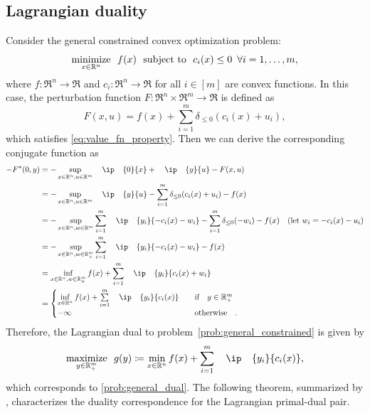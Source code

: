 \subsection{Lagrangian duality}
Consider the general constrained convex optimization problem:
\begin{equation} \label{prob:general_constrained} 
    \displaystyle\mathop{\hbox{\rm minimize}}_{x \in \mathbb{R}^n}\enspace f(x) \enspace\mathop{\hbox{\rm subject to}}\enspace c_i(x) \leq 0 \enspace \forall i = 1, \dots, m,
\end{equation}
where $f:\Re^n\to\Re$ and $c_i:\Re^n\to\Re$ for all $i\in[m]$ are convex functions. In this case, the perturbation function $F: \Re^n \times \Re^m \to \Re$ is defined as 
\begin{equation}
    F(x, u) = f(x) + \sum_{i = 1}^m \delta_{\leq 0}(c_i(x) + u_i),
\end{equation}
which satisfies \eqref{eq:value_fn_property}. Then we can derive the corresponding conjugate function as 
\begin{align*}
    -F^*(0, y) 
    &= -\sup_{x\in\Re^n, u\in\Re^m} \ip{0}{x} + \ip{y}{u} - F(x,u)
    \\&= -\sup_{x\in\Re^n, u\in\Re^m} \ip{y}{u} - \sum_{i = 1}^m \delta_{\leq 0}(c_i(x) + u_i) - f(x)
    \\&= -\sup_{x\in\Re^n, w\in\Re^m} \sum_{i=1}^m \ip{y_i}{-c_i(x) - w_i} - \sum_{i = 1}^m \delta_{\leq 0}(-w_i) - f(x) \quad (\mbox{let } w_i = -c_i(x) - u_i)
    \\&= -\sup_{x\in\Re^n, w\in\Re_+^m} \sum_{i=1}^m \ip{y_i}{- c_i(x) - w_i} - f(x)
    \\&= \inf_{x\in\Re^n, w\in\Re_+^m} f(x) + \sum_{i=1}^m \ip{y_i}{c_i(x) + w_i} 
    \\&= 
        \begin{cases}
            \inf\limits_{x\in\Re^n} f(x) + \sum\limits_{i=1}^m \ip{y_i}{c_i(x)} & \text{if} y \in\Re_+^m \\
            -\infty & \text{otherwise}.
        \end{cases}
\end{align*}
Therefore, the Lagrangian dual to problem~\eqref{prob:general_constrained} is given by
\begin{equation} \label{prob:general_constrained_dual}
    \maximize{y\in\Re_+^m} g(y) \coloneqq \min_{x \in \Re^n} f(x) + \sum_{i=1}^m \ip{y_i}{c_i(x)},
\end{equation}
which corresponds to \eqref{prob:general_dual}.
The following theorem, summarized by \citet{boyd:2004}, characterizes the duality correspondence for the Lagrangian primal-dual pair. 

